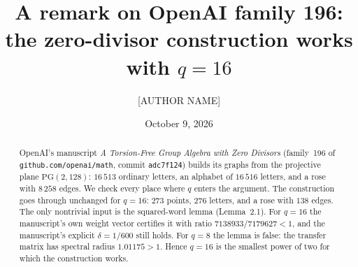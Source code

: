 \documentclass[11pt]{amsart}
\title{A remark on OpenAI family 196: the zero-divisor construction works with $q=16$}
\author{[AUTHOR NAME]}
\date{October 9, 2026}
\theoremstyle{remark}
\begin{document}
\begin{abstract}
OpenAI's manuscript \emph{A Torsion-Free Group Algebra with Zero Divisors}
(family~196 of \texttt{github.com/openai/math}, commit \texttt{adc7f124})
builds its graphs from the projective plane $\mathrm{PG}(2,128)$: $16\,513$
ordinary letters, an alphabet of $16\,516$ letters, and a rose with
$8\,258$ edges. We check every place where $q$ enters the argument. The
construction goes through unchanged for $q=16$: $273$ points, $276$ letters,
and a rose with $138$ edges. The only nontrivial input is the squared-word
lemma (Lemma~2.1). For $q=16$ the manuscript's own weight vector certifies it
with ratio $7138933/7179627<1$, and the manuscript's explicit $\delta=1/600$
still holds. For $q=8$ the lemma is false: the transfer matrix has spectral
radius $1.01175>1$. Hence $q=16$ is the smallest power of two for which the
construction works.
\end{abstract}
\maketitle
\end{document}
